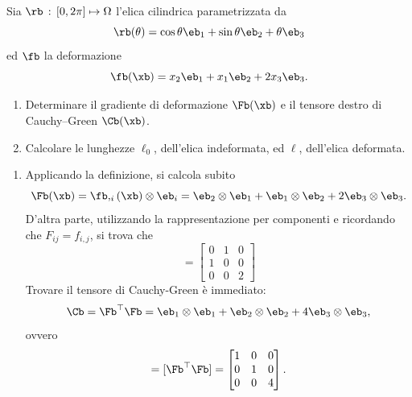 \begin{exercise}
	Sia $\rb\,:\,[0,2\pi]\mapsto\Omega$ l'elica cilindrica parametrizzata da
	\begin{equation}
		\rb(\theta)=\cos\theta\eb_1+\sin\theta\eb_2+\theta\eb_3
	\end{equation}
	ed $\fb$ la deformazione
	\begin{equation}
		\fb(\xb)=x_2\eb_1+x_1\eb_2+2 x_3\eb_3.
	\end{equation}
	\begin{enumerate}
		\item Determinare il gradiente di deformazione $\Fb(\xb)$ e il tensore destro di Cauchy--Green $\Cb(\xb)$.
		\item Calcolare le lunghezze $\ell_0$, dell'elica indeformata, ed $\ell$, dell'elica deformata.
	\end{enumerate}
	
	\begin{svolgimento}
		\begin{enumerate}
			\item Applicando la definizione, si calcola subito
			\begin{equation}
				\Fb(\xb)=\fb,_{i}(\xb)\otimes\eb_i=\eb_2\otimes\eb_1+\eb_1\otimes\eb_2+2\eb_3\otimes\eb_3.
			\end{equation}	
			D'altra parte, utilizzando la rappresentazione per componenti e ricordando che $F_{ij}=f_{i,j}$, si trova che
			\begin{equation}
				[\Fb]=\left[   
				\begin{matrix}
					0&1&0	\\
					1&0&0\\
					0&0&2
				\end{matrix}
				\right]\end{equation}
			Trovare il tensore di Cauchy-Green è immediato:
			\begin{equation}
				\Cb=\Fb^\top\Fb=\eb_1\otimes\eb_1+\eb_2\otimes\eb_2+4\eb_3\otimes\eb_3, 
			\end{equation}
			ovvero
			\begin{equation}
				[\Cb]=[\Fb^\top\Fb]=\left[
				\begin{matrix}
					1&0&0\\
					0&1&0\\
					0&0&4
				\end{matrix}
				\right].
			\end{equation}
			
			
			

\end{enumerate}
\end{svolgimento}
\end{exercise}
